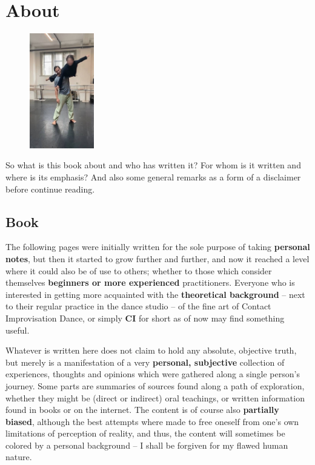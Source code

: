 \chapter{About}\label{ch:about}

\begin{figure}
\centering
\includegraphics[width=0.25\textwidth]{images/about}
\end{figure}

So what is this book about and who has written it?
For whom is it written and where is its emphasis?
And also some general remarks as a form of a disclaimer before continue reading.

\section{Book}\label{sec:book}

The following pages were initially written for the sole purpose of taking \textbf{personal notes}, but then it started to grow further and further, and now it reached a level where it could also be of use to others; whether to those which consider themselves \textbf{beginners or more experienced} practitioners.
Everyone who is interested in getting more acquainted with the \textbf{theoretical background} -- next to their regular practice in the dance studio -- of the fine art of Contact Improvisation Dance, or simply \textbf{CI} for short as of now may find something useful.

Whatever is written here does not claim to hold any absolute, objective truth, but merely is a manifestation of a very \textbf{personal, subjective} collection of experiences, thoughts and opinions which were gathered along a single person's journey.
Some parts are summaries of sources found along a path of exploration, whether they might be (direct or indirect) oral teachings, or written information found in books or on the internet.
The content is of course also \textbf{partially biased}, although the best attempts where made to free oneself from one's own limitations of perception of reality, and thus, the content will sometimes be colored by a personal background -- I shall be forgiven for my flawed human nature.

